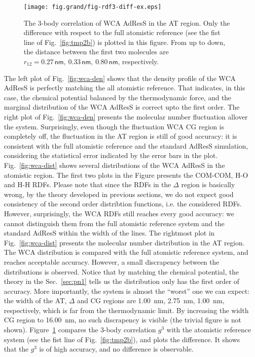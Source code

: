 \documentclass[aip,jcp,a4paper,reprint,onecolumn]{revtex4-1}
\newcommand{\bluec}[1]{{\color{blue} #1}}
\newcommand{\HY}{{\Delta}}
\begin{document}
\begin{figure}
  \centering
  \texttt{[image: fig.grand/fig-rdf3-diff-ex.eps]}
  \caption{The 3-body correlation of WCA AdResS in the AT region.
    Only the difference with respect to the full atomistic reference
    (see the fist line of Fig.~\ref{fig:tmp2b})
    is plotted in this figure. From up to down, the distance
    between the first two molecules are $r_{12} =
    0.27\,\textsf{nm},\ 0.33\,\textsf{nm},\  
    0.80\,\textsf{nm}$, respectively.
  }
  \label{fig:wca-g3}
\end{figure}



\bluec{
  The left plot of Fig.~\ref{fig:wca-den} shows that
  the density profile of the
  WCA AdResS is perfectly matching the all atomistic reference.
  That indicates, in this case, the chemical potential balanced by
  the thermodynamic force, and the marginal distribution of
  the WCA AdResS is correct upto the first order.
  The right plot of Fig.~\ref{fig:wca-den} presents the molecular
  number fluctuation allover the system.
  Surprisingly, even though the fluctuation WCA CG region is completely off,
  the fluctuation in the AT region is still of good accuracy:
  it is consistent with 
  the full atomistic reference and the standard
  AdResS simulation, considering the statistical error indicated by the
  error bars in the plot.
  Fig.~\ref{fig:wca-dist} shows several distributions of the WCA AdResS
  in the atomistic region. The first two plots in the Figure presents
  the COM-COM, H-O and H-H RDFs. Please note that since the RDFs in the
  $\Delta$ region is basically wrong, by the theory developed in previous sections, we do not expect good consistency of the second order distribtion
  functions, i.e. the considered RDFs. However, surprisingly, the
  WCA RDFs still reaches every good accuracy: we cannot distinguish
  them from the full atomistic reference system and the standard AdResS
  within the width of the lines.
  The rightmost plot in Fig.~\ref{fig:wca-dist} presents the
  molecular number distribution in the AT region. The WCA distribution
  is compared with the full atomistic reference system, and reaches
  acceptable accuracy. However, a
  small discrapency between the distributions is observed.
  Notice that by matching the chemical potential, the 
  theory in the Sec.~\ref{sec:pn1} tells us the distribution
  only has the first order of accuracy.
  More importantly, the system is almost the ``worst'' one we can expect: the
  width of the AT, $\HY$ and CG regions are
  1.00~\textsf{nm}, 2.75~\textsf{nm},
  1.00~\textsf{nm}, respectively, which is far from the thermodynamic
  limit. By increasing the width CG  region to 16.00~\textsf{nm}, no
  such discrapency is visible (the trivial figure is not shown).
  Figure~\ref{fig:wca-g3} compares the 3-body correlation $g^3$
  with the atomistic reference
  system (see the fist line of Fig.~\ref{fig:tmp2b}), and plots the difference.
  It shows that the $g^3$ is of high accuracy, and no difference is observable.
}
\end{document}
